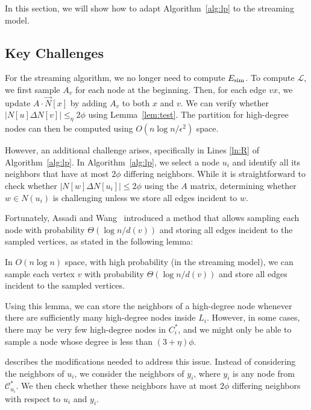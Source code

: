 
In this section, we will show how to adapt Algorithm~\ref{alg:lp} to the streaming model. 

\subsection{Key Challenges}
For the streaming algorithm, we no longer need to compute $E_{\operatorname{sim}}$. To compute $\mathcal{L}$, we first sample $A_v$ for each node at the beginning. Then, for each edge $vx$, we update $A \cdot \vec{N}[x]$ by adding $A_v$ to both $x$ and $v$. We can verify whether $|N[u] \Delta N[v]| \leq_\eta 2\phi$ using Lemma~\ref{lem:test}. The partition for high-degree nodes can then be computed using $O(n \log n / \epsilon^2)$ space.


However, an additional challenge arises, specifically in Lines \ref{ln:R} of Algorithm~\ref{alg:lp}. In Algorithm~\ref{alg:lp}, we select a node $u_i$ and identify all its neighbors that have at most $2\phi$ differing neighbors. While it is straightforward to check whether $|N[w] \Delta N[u_i]| \leq 2\phi$ using the $A$ matrix, determining whether $w \in N(u_i)$ is challenging unless we store all edges incident to $w$.

Fortunately, Assadi and Wang~\cite{AW22} introduced a method that allows sampling each node with probability $\Theta(\log n / d(v))$ and storing all edges incident to the sampled vertices, as stated in the following lemma:

\begin{lemma}
\label{lemma:assadi2021}
In $O(n \log n)$ space, with high probability (in the streaming model), we can sample each vertex $v$ with probability $\Theta(\log n / d(v))$ and store all edges incident to the sampled vertices.
\end{lemma}

Using this lemma, we can store the neighbors of a high-degree node whenever there are sufficiently many high-degree nodes inside $L_i$. However, in some cases, there may be very few high-degree nodes in $C^*_i$, and we might only be able to sample a node whose degree is less than $(3 + \eta) \phi$.

 describes the modifications needed to address this issue. Instead of considering the neighbors of $u_i$, we consider the neighbors of $y_i$, where $y_i$ is any node from $\mathcal{C}^*_{u_i}$. We then check whether these neighbors have at most $2\phi$ differing neighbors with respect to $u_i$ and $y_i$. 

